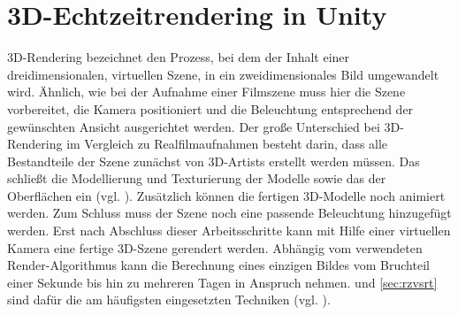 \chapter{3D-Echtzeitrendering in Unity}
\label{ch:3drender}
3D-Rendering bezeichnet den Prozess, bei dem der Inhalt einer dreidimensionalen, virtuellen Szene, in ein zweidimensionales Bild umgewandelt wird. Ähnlich, wie bei der Aufnahme einer Filmszene muss hier die Szene vorbereitet, die Kamera positioniert und die Beleuchtung entsprechend der gewünschten Ansicht ausgerichtet werden. Der große Unterschied bei 3D-Rendering im Vergleich zu Realfilmaufnahmen besteht darin, dass alle Bestandteile der Szene zunächst von 3D-Artists erstellt werden müssen. Das schließt die Modellierung und Texturierung der Modelle sowie das  der Oberflächen ein (vgl. \cite{Neumann.11.11.2020}). Zusätzlich können die fertigen 3D-Modelle noch animiert werden. Zum Schluss muss der Szene noch eine passende Beleuchtung hinzugefügt werden. Erst nach Abschluss dieser Arbeitsschritte kann mit Hilfe einer virtuellen Kamera eine fertige 3D-Szene gerendert werden. Abhängig vom verwendeten Render-Algorithmus kann die Berechnung eines einzigen Bildes vom Bruchteil einer Sekunde bis hin zu mehreren Tagen in Anspruch nehmen.  und  \ref{sec:rzvsrt} sind dafür die am häufigsten eingesetzten Techniken (vgl. \cite{Emiliano.08.08.2019}).
%
